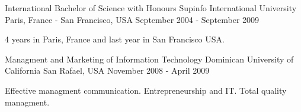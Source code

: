 

\begin{cventries}

    \cventry
    {International Bachelor of Science with Honours} %
    {Supinfo International University} %
    {Paris, France - San Francisco, USA} %
    {September 2004 - September 2009} %
    {
    \begin{cvitems} %
        \item {4 years in Paris, France and last year in San Francisco USA.}
    \end{cvitems}
    }

    \cventry
    {Managment and Marketing of Information Technology} %
    {Dominican University of California} %
    {San Rafael, USA} %
    {November 2008 - April 2009} %
    {
    \begin{cvitems} %
        \item {Effective managment communication. Entrepreneurship and IT. Total quality managment.}
    \end{cvitems}
    }

\end{cventries}
